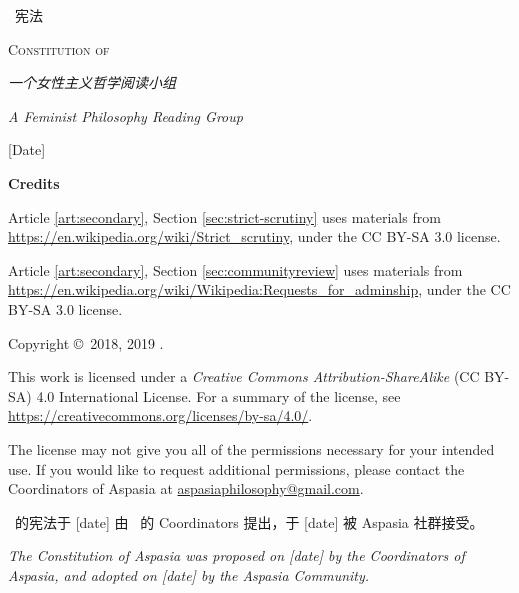 \begin{titlepage}
		\begin{center}
		\vspace*{7em}
		{\scshape\LARGE \name\ 宪法 \par}
		\vspace{1.25em}
		{\scshape\Large Constitution of \name \par}
		\vspace{6.5em}
		{\large\itshape 一个女性主义哲学阅读小组\par}
		\vspace{1em}
		{\large\itshape A Feminist Philosophy Reading Group\par}
		\vfill
		{\large[Date]\par}
		\vspace{1em}
		\end{center}
		
		\newpage %
		\thispagestyle{empty}
		\setlength{\parindent}{0pt}
		
		\textbf{Credits}\par
		\vspace{1em}
		Article \ref{art:secondary}, Section \ref{sec:strict-scrutiny} uses materials from \url{https://en.wikipedia.org/wiki/Strict_scrutiny}, under the CC BY-SA 3.0 license.\par
		\vspace{1em}
		Article \ref{art:secondary}, Section \ref{sec:communityreview} uses materials from \url{https://en.wikipedia.org/wiki/Wikipedia:Requests_for_adminship}, under the CC BY-SA 3.0 license.
		~\vfill

		Copyright \copyright\ 2018, 2019 \name.\par
		\vspace{1em}
		This work is licensed under a \textit{Creative Commons Attribution-ShareAlike} (CC BY-SA) 4.0 International License. For a summary of the license, see \url{https://creativecommons.org/licenses/by-sa/4.0/}.\par
		\vspace{1em}
		The license may not give you all of the permissions necessary for your intended use. If you would like to request additional permissions, please contact the Coordinators of Aspasia at \href{mailto:aspasiaphilosophy@gmail.com}
		{\ttfamily aspasiaphilosophy@gmail.com}.
	\end{titlepage}

	\newpage
	\vspace*{6em}
	\thispagestyle{empty}
	
	\name\ 的宪法于 [date] 由 \name\ 的 Coordinators 提出，于 [date] 被 Aspasia 社群接受。
	
	\vspace{2em}
	
	\textit{The Constitution of Aspasia was proposed on [date] by the Coordinators of Aspasia, and adopted on [date] by the Aspasia Community.}